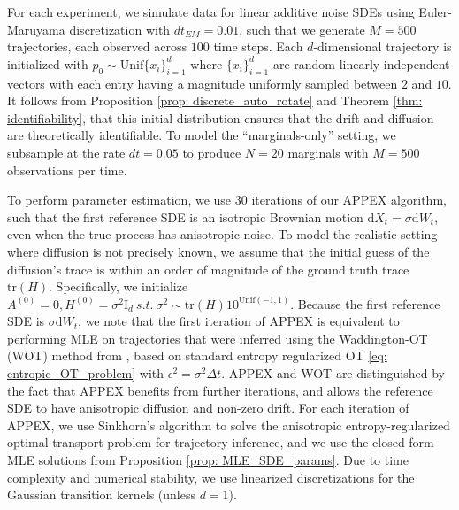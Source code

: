 \documentclass[twoside,11pt]{article}
\newcommand{\Id}{\mathrm{I}_d}
\newcommand{\todo}[1]{\textbf{\textcolor{red}{TODO: #1}}}
\begin{document}
For each experiment, we simulate data for linear additive noise SDEs using Euler-Maruyama discretization with $dt_{EM}=0.01$, such that we generate $M=500$ trajectories, each observed across $100$ time steps. Each $d$-dimensional trajectory is initialized with $p_0\sim \text{Unif}\{x_i\}_{i=1}^{d}$ where $\{x_i\}_{i=1}^{d}$ are random linearly independent vectors with each entry having a magnitude uniformly sampled between $2$ and $10$. It follows from Proposition \ref{prop: discrete_auto_rotate} and Theorem \ref{thm: identifiability}, that this initial distribution ensures that the drift and diffusion are theoretically identifiable. To model the ``marginals-only'' setting, we subsample at the rate $dt=0.05$ to produce $N=20$ marginals with $M=500$ observations per time. 

To perform parameter estimation, we use $30$ iterations of our APPEX algorithm, such that the first reference SDE is an isotropic Brownian motion $\mathrm{d}X_t = \sigma \mathrm{d}W_t$, even when the true process has anisotropic noise. To model the realistic setting where diffusion is not precisely known, we assume that the initial guess of the diffusion's trace is within an order of magnitude of the ground truth trace $\text{tr}(H)$. Specifically, we initialize $A^{(0)} = 0, H^{(0)}=\sigma^2 \Id \ s.t. \ \sigma^2 \sim \text{tr}(H)10^{\text{Unif}(-1,1)}$. Because the first reference SDE is $\sigma \mathrm{d}W_t$, we note that the first iteration of APPEX is equivalent to performing MLE on trajectories that were inferred using the Waddington-OT (WOT) method from \citet{schiebinger2019optimal}, based on standard entropy regularized OT \eqref{eq: entropic_OT_problem} with $\epsilon^2 = \sigma^2 \Delta t$. APPEX and WOT are distinguished by the fact that APPEX benefits from further iterations, and allows the reference SDE to have anisotropic diffusion and non-zero drift. For each iteration of APPEX, we use Sinkhorn's algorithm to solve the anisotropic entropy-regularized optimal transport problem for trajectory inference, and we use the closed form MLE solutions from Proposition \ref{prop: MLE_SDE_params}. Due to time complexity and numerical stability, we use linearized discretizations for the Gaussian transition kernels (unless $d=1$).
\end{document}
